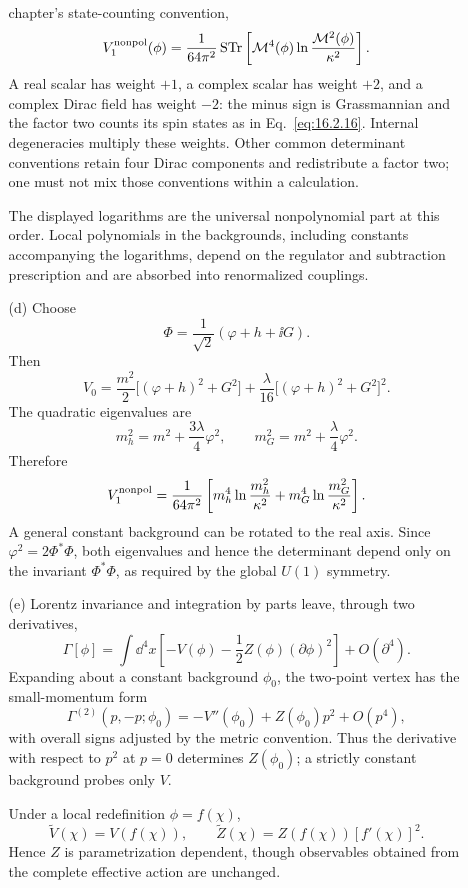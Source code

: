 \begin{enumerate}
\begin{enumerate}
    chapter's state-counting convention,
    \[
      V_1^{\rm nonpol}(\phi)
        =\frac1{64\pi^2}
          \operatorname{STr}\left[
            \mathcal M^4(\phi)
            \ln\frac{\mathcal M^2(\phi)}{\kappa^2}\right].
    \]
    A real scalar has weight \(+1\), a complex scalar has weight \(+2\),
    and a complex Dirac field has weight \(-2\): the minus sign is
    Grassmannian and the factor two counts its spin states as in
    Eq.~\eqref{eq:16.2.16}.  Internal degeneracies multiply these weights.
    Other common determinant conventions retain four Dirac components and
    redistribute a factor two; one must not mix those conventions within a
    calculation.

    The displayed logarithms are the universal nonpolynomial part at this
    order.  Local polynomials in the backgrounds, including constants
    accompanying the logarithms, depend on the regulator and subtraction
    prescription and are absorbed into renormalized couplings.
    \item[(d)]
    Choose
    \[
      \Phi=\frac1{\sqrt2}(\varphi+h+\ii G).
    \]
    Then
    \[
      V_0=\frac{m^2}{2}\bigl[(\varphi+h)^2+G^2\bigr]
         +\frac{\lambda}{16}
          \bigl[(\varphi+h)^2+G^2\bigr]^2.
    \]
    The quadratic eigenvalues are
    \[
      m_h^2=m^2+\frac{3\lambda}{4}\varphi^2,
      \qquad
      m_G^2=m^2+\frac{\lambda}{4}\varphi^2.
    \]
    Therefore
    \[
      V_1^{\rm nonpol}
        =\frac1{64\pi^2}\left[
          m_h^4\ln\frac{m_h^2}{\kappa^2}
          +m_G^4\ln\frac{m_G^2}{\kappa^2}\right].
    \]
    A general constant background can be rotated to the real axis.  Since
    \(\varphi^2=2\Phi^*\Phi\), both eigenvalues and hence the determinant
    depend only on the invariant \(\Phi^*\Phi\), as required by the global
    \(U(1)\) symmetry.
    \item[(e)]
    Lorentz invariance and integration by parts leave, through two
    derivatives,
    \[
      \Gamma[\phi]
        =\int \dd^4x\left[-V(\phi)
          -\frac12Z(\phi)(\partial\phi)^2\right]+O(\partial^4).
    \]
    Expanding about a constant background \(\phi_0\), the two-point vertex
    has the small-momentum form
    \[
      \Gamma^{(2)}(p,-p;\phi_0)
        =-V''(\phi_0)+Z(\phi_0)p^2+O(p^4),
    \]
    with overall signs adjusted by the metric convention.  Thus the
    derivative with respect to \(p^2\) at \(p=0\) determines \(Z(\phi_0)\);
    a strictly constant background probes only \(V\).

    Under a local redefinition \(\phi=f(\chi)\),
    \[
      \widetilde V(\chi)=V(f(\chi)),\qquad
      \widetilde Z(\chi)=Z(f(\chi))[f'(\chi)]^2.
    \]
    Hence \(Z\) is parametrization dependent, though observables obtained
    from the complete effective action are unchanged.
  \end{enumerate}


\end{enumerate}
